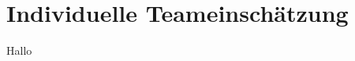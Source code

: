 \chapter{Individuelle Teameinschätzung}

Hallo

\begin{comment}
In diesem Kapitel wird beschrieben, welche Rollen die Teammitglieder mittels Selbsteinsch"atzung erhalten. Dazu wird ein Test verwendet, welcher urspr"unglich von R.M. Belbin \cite{belbin1981management} entwickelt und an der Universit"at Regensburg ins Deutsche übersetzt wurde\cite{Studienbrief}. In diesem Test werden verschiedenste Aussagen bezüglich des eigenen Verhaltens in bestimmten Situationen mittels eines Punktesystems bewertet. Am Ende trägt man die Punkte in ein Raster ein, aus welchem sich dann die passenden Rollen herauskristallisieren.

\subsection*{Pascal Horat}
Da ich in meinem Leben schon andere, ähnliche Tests ausgefüllt habe, wusste ich welche Rollen ich als Resultat in etwa zu erwarten hatte. Trotzdem war ich gespannt, ob sich auch dieses Mal dieselben Tendenzen zeigen würden. \\

Tatsächlich erreichte, wie von mir im vornherein erwartet, die Rolle des Koordinators die höchste Punktzahl. Allerdings war ich überrascht mit welcher Deutlichkeit das Resultat ausfiel. Wie in obiger Grafik ersichtlich, haben die Rolle des Pragmatikers und des Vollenders die zweitgrösste Ausprägung (orange markiert). Auch sieht man, das die Visionärsrolle und die des Akquisiteurs fast keine Punkte erhalten haben. Die äusserst niedrige Punkteausbeute beim Visionär hat mich eher überrascht. Ich finde nämlich, das oft alternative Ansätze und neue Ideen von meiner Seite kommen.

\subsection*{Steve Gerome Kamga}
Das Resultat meiner Auswertung mit der Belbin-Methode hat einige Teamrollen aufgezeigt, die zu meinen Fähigkeiten und meinem Verhalten bezüglich der Zusammenarbeit passen könnten. Nachfolgend werden die drei Teamrollen erwähnt, bei denen ich die meisten Punkte bekommen habe.
Als erstes kommt der Pragmatiker, der sich als eine auf die anstehende Sache und entsprechendes praktisches Handeln gerichtete Person definieren lässt. Danach folgen der Spezialist und der Vollender.
\newline
Nach dieser Bewertungsmethode habe ich in Ruhe die drei obengenannten Teamrollen überdacht und mir einige persönliche Fragen gestellt. Resultierend würde ich sagen, dass die Ergebnisse bei mir mindestens zu 60\% stimmen, obwohl die Belbin-Methode nur auf Einschätzungen basiert.



\end{comment}
